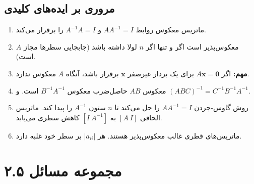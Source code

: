 \documentclass[12pt, a4paper]{book}
\begin{document}
	\subsection*{مروری بر ایده‌های کلیدی}
	\begin{enumerate}
		\item ماتریس معکوس روابط $AA^{-1}=I$ و $A^{-1}A=I$ را برقرار می‌کند.
		\item $A$ معکوس‌پذیر است اگر و تنها اگر $n$ لولا داشته باشد (جابجایی سطرها مجاز است).
		\item \textbf{مهم:} اگر $A\mathbf{x}=\mathbf{0}$ برای یک بردار غیرصفر $\mathbf{x}$ برقرار باشد، آنگاه $A$ معکوس ندارد.
		\item معکوس $AB$ حاصل‌ضرب معکوس $B^{-1}A^{-1}$ است. و $(ABC)^{-1} = C^{-1}B^{-1}A^{-1}$.
		\item روش گاوس-جردن $AA^{-1}=I$ را حل می‌کند تا $n$ ستون $A^{-1}$ را پیدا کند. ماتریس الحاقی $[A \ I]$ به $[I \ A^{-1}]$ کاهش سطری می‌یابد.
		\item ماتریس‌های قطری غالب معکوس‌پذیر هستند. هر $|a_{ii}|$ بر سطر خود غلبه دارد.
	\end{enumerate}
	
	
	\newpage
	\section*{مجموعه مسائل ۲.۵}
\end{document}
